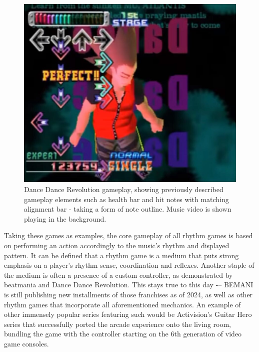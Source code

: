\begin{figure}[h]
    \centering\includegraphics[scale=0.271]{obrazki/ddrgameplay.jpg}
    \caption{Dance Dance Revolution gameplay, showing previously described gameplay elements such as health bar and hit notes with matching alignment bar - taking a form of note outline. Music video is shown playing in the background. \cite{ddrgameplay}}
    \label{fig:ddr_gameplay}
\end{figure}
\pagebreak
Taking these games as examples, the core gameplay of all rhythm games is based on performing an action accordingly to the music's rhythm and displayed pattern. It can be defined that a rhythm game is a medium that puts strong emphasis on a player's rhythm sense, coordination and reflexes. Another staple of the medium is often a presence of a custom controller, as demonstrated by beatmania and Dance Dance Revolution. This stays true to this day -– BEMANI is still publishing new installments of those franchises as of 2024, as well as other rhythm games that incorporate all aforementioned mechanics. An example of other immensely popular series featuring such would be Activision's Guitar Hero series that successfully ported the arcade experience onto the living room, bundling the game with the controller starting on the 6th generation of video game consoles.

